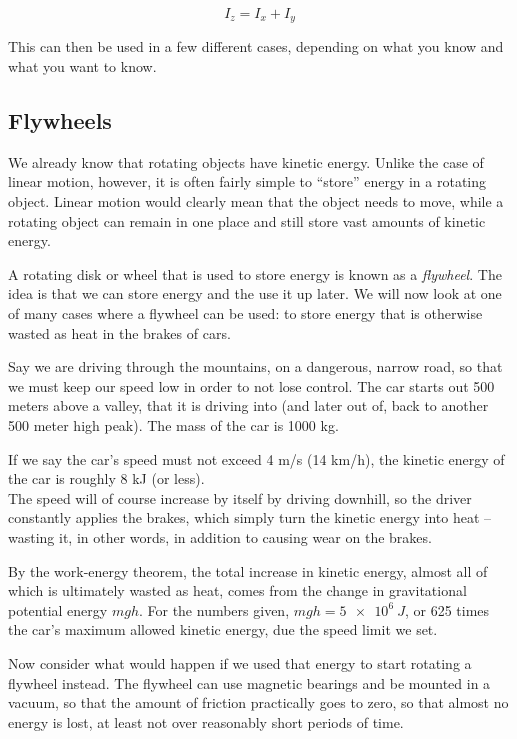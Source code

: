 \documentclass[8.01x]{subfiles}
\begin{document}
\begin{equation}
I_z = I_x + I_y
\end{equation}

This can then be used in a few different cases, depending on what you know and what you want to know.

\subsection{Flywheels}

We already know that rotating objects have kinetic energy. Unlike the case of linear motion, however, it is often fairly simple to ``store'' energy in a rotating object. Linear motion would clearly mean that the object needs to move, while a rotating object can remain in one place and still store vast amounts of kinetic energy.

A rotating disk or wheel that is used to store energy is known as a \emph{flywheel}. The idea is that we can store energy and the use it up later. We will now look at one of many cases where a flywheel can be used: to store energy that is otherwise wasted as heat in the brakes of cars.

Say we are driving through the mountains, on a dangerous, narrow road, so that we must keep our speed low in order to not lose control. The car starts out 500 meters above a valley, that it is driving into (and later out of, back to another 500 meter high peak). The mass of the car is 1000 kg.

If we say the car's speed must not exceed 4 m/s (14 km/h), the kinetic energy of the car is roughly 8 kJ (or less).\\
The speed will of course increase by itself by driving downhill, so the driver constantly applies the brakes, which simply turn the kinetic energy into heat -- wasting it, in other words, in addition to causing wear on the brakes.

By the work-energy theorem, the total increase in kinetic energy, almost all of which is ultimately wasted as heat, comes from the change in gravitational potential energy $m g h$. For the numbers given, $m g h = \SI{5e6}{J}$, or 625 times the car's maximum allowed kinetic energy, due the speed limit we set.

Now consider what would happen if we used that energy to start rotating a flywheel instead. The flywheel can use magnetic bearings and be mounted in a vacuum, so that the amount of friction practically goes to zero, so that almost no energy is lost, at least not over reasonably short periods of time.
\end{document}
